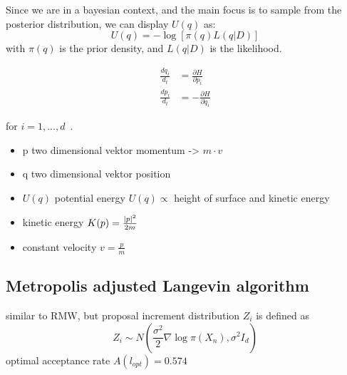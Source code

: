 Since we are in a bayesian context, and the main focus is to sample from the posterior distribution, we can display $U(q)$ as: 
\[
U(q) = -\log[\pi(q)L(q|D)]
\]
with $\pi(q)$ is the prior density, and $L(q|D)$ is the likelihood.



\begin{align*}
    \frac{dq_i}{d_t}&=\frac{\partial H}{\partial p_i} \\
    \frac{dp_i}{d_t}&=-\frac{\partial H}{\partial q_i}
\end{align*}

for $i=1,...,d$~\cite{MR2858447}. 


  

\begin{itemize}
    \item p two dimensional vektor momentum -> $m\cdot v$
    \item q two dimensional vektor position 
    \item $U(q)$ potential energy $U(q)\propto$ height of surface and kinetic energy
    \item kinetic energy $K(p)=\frac{\left\lvert p\right\rvert^2}{2m}$
    \item constant velocity $v=\frac{p}{m}$
\end{itemize}   
\subsection{Metropolis adjusted Langevin algorithm}
similar to RMW, but proposal increment distribution $Z_i$ is defined as 
\[
Z_i \sim N(\frac{\sigma^2}{2}\nabla\log\pi(X_n),\sigma^2I_d)
\]
optimal acceptance rate $A(l_{opt})=0.574$

